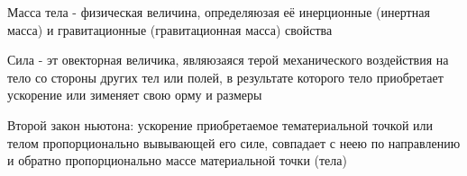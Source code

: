 \documentclass{article}
\begin{document}
Масса тела - физическая величина, определяюзая её инерционные (инертная масса) и гравитационные (гравитационная масса) свойства 

Сила - эт овекторная величика, являюзаяся терой механического воздействия на тело со стороны других тел или полей, в результате которого тело приобретает ускорение или зименяет свою орму и размеры 

Второй закон ньютона: ускорение приобретаемое тематериальной точкой или телом пропорционально вывывающей его силе, совпадает с неею по направлению и обратно пропорционально массе материальной точки (тела)
\end{document}
